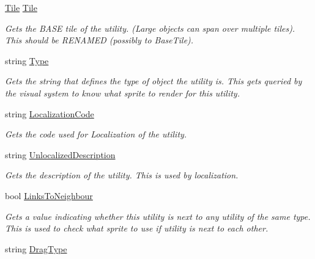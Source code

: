 \begin{DoxyCompactItemize}
\hyperlink{class_tile}{Tile} \hyperlink{class_utility_a4c2701b68c0b9edf73a2ebf30507cd5f}{Tile}
\begin{DoxyCompactList}\small\item\em Gets the B\+A\+SE tile of the utility. (Large objects can span over multiple tiles). This should be R\+E\+N\+A\+M\+ED (possibly to Base\+Tile). \end{DoxyCompactList}\item 
string \hyperlink{class_utility_a482c0a04d918813023914288701526f6}{Type}
\begin{DoxyCompactList}\small\item\em Gets the string that defines the type of object the utility is. This gets queried by the visual system to know what sprite to render for this utility. \end{DoxyCompactList}\item 
string \hyperlink{class_utility_a6f65ac813baf71fa3dd074cdc5f0dac9}{Localization\+Code}
\begin{DoxyCompactList}\small\item\em Gets the code used for Localization of the utility. \end{DoxyCompactList}\item 
string \hyperlink{class_utility_a35e4fbf70d953b969e2637bba1256254}{Unlocalized\+Description}
\begin{DoxyCompactList}\small\item\em Gets the description of the utility. This is used by localization. \end{DoxyCompactList}\item 
bool \hyperlink{class_utility_a296d48306922e1bf7a859171849ea7da}{Links\+To\+Neighbour}
\begin{DoxyCompactList}\small\item\em Gets a value indicating whether this utility is next to any utility of the same type. This is used to check what sprite to use if utility is next to each other. \end{DoxyCompactList}\item 
string \hyperlink{class_utility_a6594cc21d854b3a0962bf10a12b1306b}{Drag\+Type}

\end{DoxyCompactItemize}
